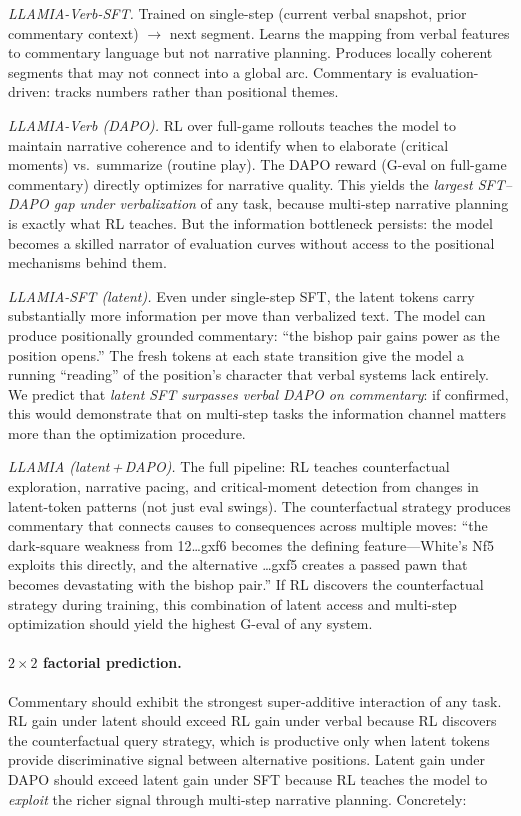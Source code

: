 \emph{LLAMIA-Verb-SFT.}
Trained on single-step (current verbal snapshot, prior commentary context)
$\to$ next segment.
Learns the mapping from verbal features to commentary language but not
narrative planning.
Produces locally coherent segments that may not connect into a global arc.
Commentary is evaluation-driven: tracks numbers rather than positional themes.

\emph{LLAMIA-Verb (DAPO).}
RL over full-game rollouts teaches the model to maintain narrative coherence
and to identify when to elaborate (critical moments) vs.\ summarize
(routine play).
The DAPO reward (G-eval on full-game commentary) directly optimizes for
narrative quality.
This yields the \emph{largest SFT--DAPO gap under verbalization} of any
task, because multi-step narrative planning is exactly what RL teaches.
But the information bottleneck persists: the model becomes a skilled narrator
of evaluation curves without access to the positional mechanisms behind
them.

\emph{LLAMIA-SFT (latent).}
Even under single-step SFT, the latent tokens carry substantially more
information per move than verbalized text.
The model can produce positionally grounded commentary: ``the bishop pair
gains power as the position opens.''
The fresh tokens at each state transition give the model a running
``reading'' of the position's character that verbal systems lack entirely.
We predict that \emph{latent SFT surpasses verbal DAPO on
commentary}: if confirmed, this would demonstrate that on multi-step tasks
the information channel matters more than the optimization procedure.

\emph{LLAMIA (latent\,+\,DAPO).}
The full pipeline: RL teaches counterfactual exploration, narrative pacing,
and critical-moment detection from changes in latent-token patterns (not
just eval swings).
The counterfactual strategy produces commentary that connects causes to
consequences across multiple moves: ``the dark-square weakness from
12\ldots{}gxf6 becomes the defining feature---White's Nf5 exploits this
directly, and the alternative \ldots{}gxf5 creates a passed pawn that
becomes devastating with the bishop pair.''
If RL discovers the counterfactual strategy during training, this
combination of latent access and multi-step optimization should yield the
highest G-eval of any system.

\paragraph{$2{\times}2$ factorial prediction.}
Commentary should exhibit the strongest super-additive interaction of any
task.
RL gain under latent should exceed RL gain under verbal because RL discovers
the counterfactual query strategy, which is productive only when latent
tokens provide discriminative signal between alternative positions.
Latent gain under DAPO should exceed latent gain under SFT because RL
teaches the model to \emph{exploit} the richer signal through multi-step
narrative planning.
Concretely:

